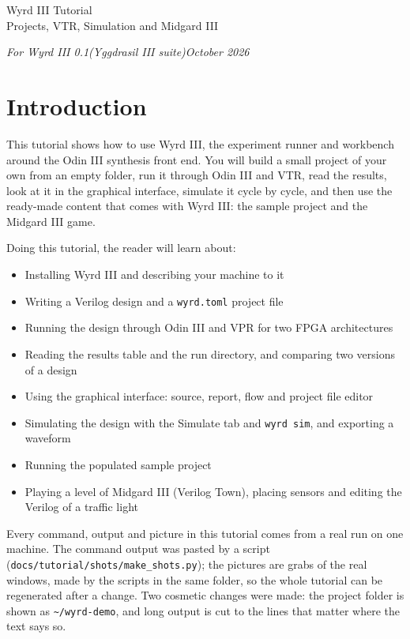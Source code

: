 \documentclass[11pt]{article}
\newcommand{\cmd}[1]{\texttt{#1}}
\begin{document}
\begin{center}
{\sffamily\LARGE Wyrd III Tutorial\\[2pt] Projects, VTR, Simulation and Midgard III}
\end{center}
\vspace{2pt}
\noindent\colorbox{banner}{\parbox{\dimexpr\linewidth-2\fboxsep}{\color{white}\sffamily\itshape\small For Wyrd III 0.1\quad(Yggdrasil III suite)\hfill October 2026}}

\begingroup\hypersetup{linkcolor=blue!60!black}
\renewcommand{\contentsname}{Contents}
\tableofcontents
\endgroup
\clearpage

\section{Introduction}

This tutorial shows how to use Wyrd III, the experiment runner and workbench around the Odin III
synthesis front end. You will build a small project of your own from an empty folder, run it through
Odin III and VTR, read the results, look at it in the graphical interface, simulate it cycle by cycle,
and then use the ready-made content that comes with Wyrd III: the sample project and the Midgard III game.

Doing this tutorial, the reader will learn about:
\begin{itemize}
\item Installing Wyrd III and describing your machine to it
\item Writing a Verilog design and a \cmd{wyrd.toml} project file
\item Running the design through Odin III and VPR for two FPGA architectures
\item Reading the results table and the run directory, and comparing two versions of a design
\item Using the graphical interface: source, report, flow and project file editor
\item Simulating the design with the Simulate tab and \cmd{wyrd sim}, and exporting a waveform
\item Running the populated sample project
\item Playing a level of Midgard III (Verilog Town), placing sensors and editing the Verilog of a traffic light
\end{itemize}

Every command, output and picture in this tutorial comes from a real run on one machine. The command
output was pasted by a script (\cmd{docs/tutorial/shots/make\_shots.py}); the pictures are grabs of the real
windows, made by the scripts in the same folder, so the whole tutorial can be regenerated after a change.
Two cosmetic changes were made: the project folder is shown as \cmd{\textasciitilde/wyrd-demo}, and long
output is cut to the lines that matter where the text says so.
\end{document}

